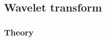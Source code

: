 \documentclass[11pt, oneside]{article}   	%
\begin{document}
%
%
%





\subsection{Wavelet transform}
\subsubsection{Theory}
\end{document}

